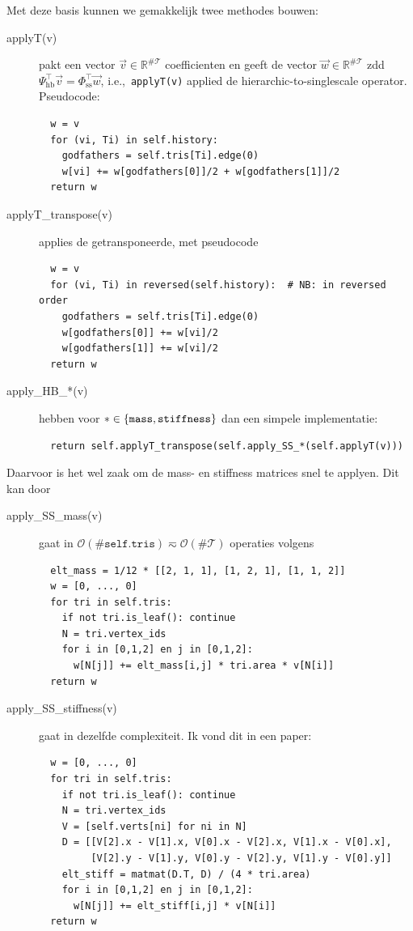\documentclass[11pt,a4paper]{amsart}
\theoremstyle{definition}
\newcommand{\T}{{\mathcal T}}
\newcommand{\R}{\mathbb{R}}
\begin{document}
Met deze basis kunnen we gemakkelijk twee methodes bouwen:
\begin{description}
  \item[applyT(v)] pakt een vector $\vec v \in \R^{\# \T}$ coefficienten en geeft de vector $\vec w \in \R^{\# \T}$ zdd $\Psi_{\text{hb}}^\top \vec v = \Phi_{\text{ss}}^\top \vec w$,
    i.e.,~\texttt{applyT(v)} applied de hierarchic-to-singlescale operator.
    Pseudocode:
\begin{verbatim}
  w = v
  for (vi, Ti) in self.history:
    godfathers = self.tris[Ti].edge(0)
    w[vi] += w[godfathers[0]]/2 + w[godfathers[1]]/2
  return w
\end{verbatim}
  \item[applyT\_transpose(v)] applies de getransponeerde, met pseudocode
\begin{verbatim}
  w = v
  for (vi, Ti) in reversed(self.history):  # NB: in reversed order
    godfathers = self.tris[Ti].edge(0)
    w[godfathers[0]] += w[vi]/2
    w[godfathers[1]] += w[vi]/2
  return w
\end{verbatim}
  \item[apply\_HB\_*(v)] hebben voor $* \in \set{\mathtt{mass}, \mathtt{stiffness}}$ dan een simpele
    implementatie:
\begin{verbatim}
  return self.applyT_transpose(self.apply_SS_*(self.applyT(v)))
\end{verbatim}
\end{description}
Daarvoor is het wel zaak om de mass- en stiffness matrices snel te applyen. Dit kan door
\begin{description}
  \item[apply\_SS\_mass(v)] gaat in $\mathcal O(\# \mathtt{self.tris}) \eqsim \mathcal O(\# \T)$ operaties volgens
\begin{verbatim}
  elt_mass = 1/12 * [[2, 1, 1], [1, 2, 1], [1, 1, 2]]
  w = [0, ..., 0]
  for tri in self.tris:
    if not tri.is_leaf(): continue
    N = tri.vertex_ids
    for i in [0,1,2] en j in [0,1,2]:
      w[N[j]] += elt_mass[i,j] * tri.area * v[N[i]]
  return w
\end{verbatim}
  \item[apply\_SS\_stiffness(v)] gaat in dezelfde complexiteit. Ik vond dit in een paper:
\begin{verbatim}
  w = [0, ..., 0]
  for tri in self.tris:
    if not tri.is_leaf(): continue
    N = tri.vertex_ids
    V = [self.verts[ni] for ni in N]
    D = [[V[2].x - V[1].x, V[0].x - V[2].x, V[1].x - V[0].x],
         [V[2].y - V[1].y, V[0].y - V[2].y, V[1].y - V[0].y]]
    elt_stiff = matmat(D.T, D) / (4 * tri.area)
    for i in [0,1,2] en j in [0,1,2]:
      w[N[j]] += elt_stiff[i,j] * v[N[i]]
  return w
\end{verbatim}
\end{description}
\end{document}

